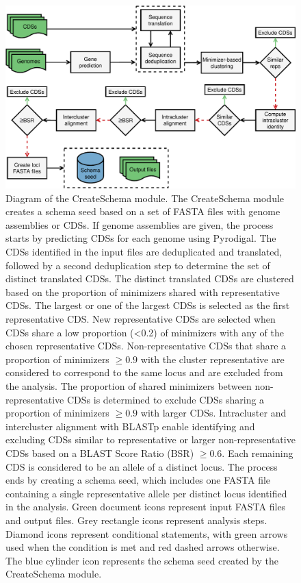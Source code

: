\newpage
\begin{figure}[h!]
    \centering
    \includegraphics[angle=0,width=\textwidth]{figures/chapter 2/FigureS5.pdf}
    \caption{Diagram of the CreateSchema module. The CreateSchema module creates a schema seed based on a set of FASTA files with genome assemblies or CDSs. If genome assemblies are given, the process starts by predicting CDSs for each genome using Pyrodigal. The CDSs identified in the input files are deduplicated and translated, followed by a second deduplication step to determine the set of distinct translated CDSs. The distinct translated CDSs are clustered based on the proportion of minimizers shared with representative CDSs. The largest or one of the largest CDSs is selected as the first representative CDS. New representative CDSs are selected when CDSs share a low proportion (<0.2) of minimizers with any of the chosen representative CDSs. Non-representative CDSs that share a proportion of minimizers $\geq0.9$ with the cluster representative are considered to correspond to the same locus and are excluded from the analysis. The proportion of shared minimizers between non-representative CDSs is determined to exclude CDSs sharing a proportion of minimizers $\geq0.9$ with larger CDSs. Intracluster and intercluster alignment with BLASTp enable identifying and excluding CDSs similar to representative or larger non-representative CDSs based on a BLAST Score Ratio (BSR) $\geq0.6$. Each remaining CDS is considered to be an allele of a distinct locus. The process ends by creating a schema seed, which includes one FASTA file containing a single representative allele per distinct locus identified in the analysis. Green document icons represent input FASTA files and output files. Grey rectangle icons represent analysis steps. Diamond icons represent conditional statements, with green arrows used when the condition is met and red dashed arrows otherwise. The blue cylinder icon represents the schema seed created by the CreateSchema module.}
    \label{fig:chap2_figureS5}
\end{figure}

